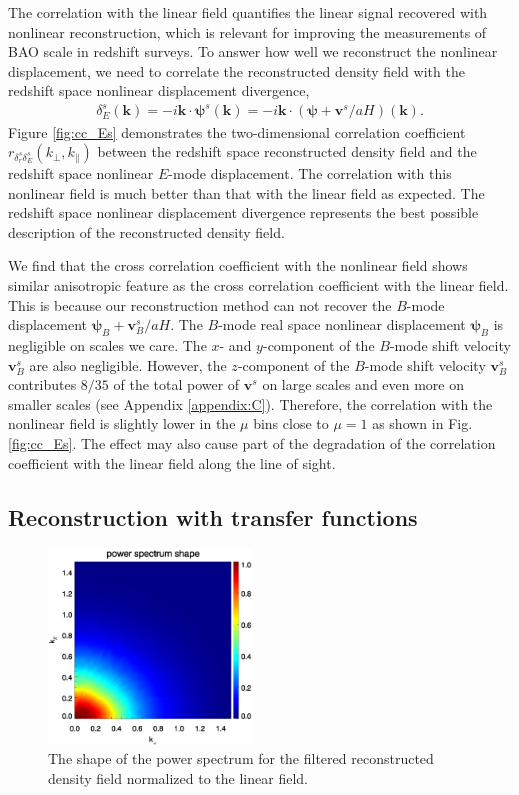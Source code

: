 \documentclass[aps,prx,twocolumn,superscriptaddress,groupedaddress,nofootinbib,amsfont]{revtex4}  %
\newcommand{\bea}{\begin{eqnarray}}
\newcommand{\eea}{\end{eqnarray}}
\newcommand{\bmp}{\bm{\psi}}
\newcommand{\bmv}{\bm{v}}
\newcommand{\bmk}{\bm{k}}
\begin{document}
The correlation with the linear field quantifies the linear signal recovered
with nonlinear reconstruction, which is relevant for improving the measurements
of BAO scale in redshift surveys. 
To answer how well we reconstruct the nonlinear displacement, we need to
correlate the reconstructed density field with the redshift space nonlinear 
displacement divergence,
\bea
\delta_E^s(\bmk)=-i\bmk\cdot\bmp^s(\bmk)=-i\bmk\cdot(\bmp+\bmv^s/aH)(\bmk).
\eea
Figure \ref{fig:cc_Es} demonstrates the two-dimensional correlation coefficient 
$r_{\delta_r^s\delta_E^s}(k_\perp,k_\parallel)$ between the redshift space reconstructed density field and the redshift space nonlinear $E$-mode displacement.
The correlation with this nonlinear field is much better than that with the 
linear field as expected.
The redshift space nonlinear displacement divergence represents the best 
possible description of the reconstructed density field.

We find that the cross correlation coefficient with the nonlinear field shows 
similar anisotropic feature as the cross correlation coefficient with the 
linear field. This is because our reconstruction method can not recover the 
$B$-mode displacement $\bmp_B+\bmv_B^s/aH$. The $B$-mode real space nonlinear 
displacement $\bmp_B$ is negligible on scales we care. The $x$- and $y$-component of the $B$-mode shift velocity $\bmv^s_B$ are also negligible.
However, the $z$-component of the $B$-mode shift velocity $\bmv^s_B$ contributes
$8/35$ of the total power of $\bmv^s$ on large scales and even more on smaller
scales (see Appendix \ref{appendix:C}). 
Therefore, the correlation with the nonlinear field is slightly lower in the 
$\mu$ bins close to $\mu=1$ as shown in Fig. \ref{fig:cc_Es}.
The effect may also cause part of the degradation of the correlation coefficient
with the linear field along the line of sight.


\subsection{Reconstruction with transfer functions}

\begin{figure}[tbp]
\begin{center}
\includegraphics[width=0.48\textwidth]{0.000anishape_deltaRs-tfxLs_4x.eps}
\end{center}
\vspace{-0.7cm}
\caption{The shape of the power spectrum for the filtered reconstructed density 
    field normalized to the linear field.}
\label{fig:shape_Ls}
\end{figure}
\end{document}
